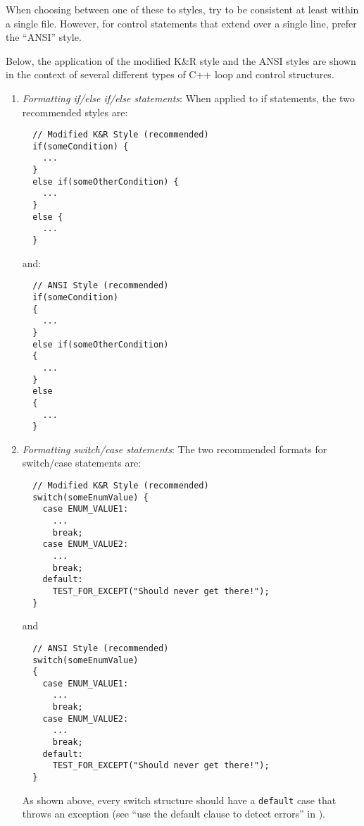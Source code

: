 \begin{enumerate}
When choosing between one of these to styles, try to be consistent at least
within a single file.  However, for control statements that extend over a
single line, prefer the ``ANSI'' style.

Below, the application of the modified K\&R style and the ANSI styles are
shown in the context of several different types of C++ loop and control
structures.

  \begin{enumerate}

  {}\item\textit{Formatting if/else if/else
  statements}: When applied to if statements, the two recommended styles are:

  {\small\begin{verbatim}
  // Modified K&R Style (recommended)
  if(someCondition) {
    ...
  }
  else if(someOtherCondition) {
    ...
  }
  else {
    ...
  }
  \end{verbatim}}
  
  {}\noindent{}and:
  
  {\small\begin{verbatim}
  // ANSI Style (recommended)
  if(someCondition)
  {
    ...
  }
  else if(someOtherCondition)
  {
    ...
  }
  else
  {
    ...
  }
  \end{verbatim}}

  {}\item\textit{Formatting switch/case statements}:
  The two recommended formats for switch/case statements are:

  {\small\begin{verbatim}
  // Modified K&R Style (recommended)
  switch(someEnumValue) {
    case ENUM_VALUE1:
      ...
      break;
    case ENUM_VALUE2:
      ...
      break;
    default:
      TEST_FOR_EXCEPT("Should never get there!");
  }
  \end{verbatim}}

  {}\noindent{}and

  {\small\begin{verbatim}
  // ANSI Style (recommended)
  switch(someEnumValue)
  {
    case ENUM_VALUE1:
      ...
      break;
    case ENUM_VALUE2:
      ...
      break;
    default:
      TEST_FOR_EXCEPT("Should never get there!");
  }
  \end{verbatim}}

  As shown above, every switch structure should have a {}\texttt{default} case
  that throws an exception (see ``use the default clause to detect errors''
  in {}\cite[Section 15.1]{CodeComplete2nd04}).


\end{enumerate}
\end{enumerate}
